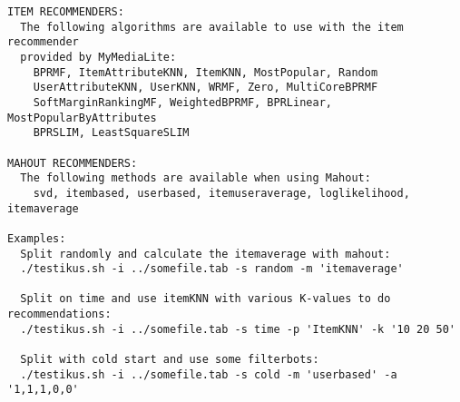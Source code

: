 \begin{lstlisting}
ITEM RECOMMENDERS:
  The following algorithms are available to use with the item recommender
  provided by MyMediaLite:
    BPRMF, ItemAttributeKNN, ItemKNN, MostPopular, Random
    UserAttributeKNN, UserKNN, WRMF, Zero, MultiCoreBPRMF
    SoftMarginRankingMF, WeightedBPRMF, BPRLinear, MostPopularByAttributes
    BPRSLIM, LeastSquareSLIM

MAHOUT RECOMMENDERS:
  The following methods are available when using Mahout:
    svd, itembased, userbased, itemuseraverage, loglikelihood, itemaverage

Examples:
  Split randomly and calculate the itemaverage with mahout:
  ./testikus.sh -i ../somefile.tab -s random -m 'itemaverage'

  Split on time and use itemKNN with various K-values to do recommendations:
  ./testikus.sh -i ../somefile.tab -s time -p 'ItemKNN' -k '10 20 50'

  Split with cold start and use some filterbots:
  ./testikus.sh -i ../somefile.tab -s cold -m 'userbased' -a '1,1,1,0,0'


\end{lstlisting}

